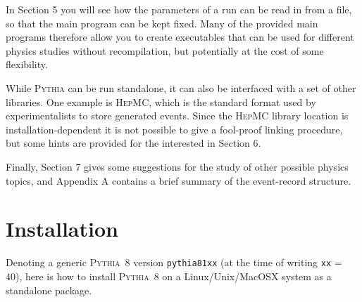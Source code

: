 \documentclass[12pt,a4paper]{article}
\begin{document}
In Section 5 you will see how the parameters of a run can be read in 
from a file, so that the main program can be kept fixed. Many of the 
provided main programs therefore allow you to create executables that 
can be used for different physics studies without recompilation,
but potentially at the cost of some flexibility.    

While \textsc{Pythia} can be run standalone, it can also be interfaced 
with a set of other libraries. One example is \textsc{HepMC}, which 
is the standard format used by experimentalists to store generated 
events. Since the \textsc{HepMC} library location is 
installation-dependent it is not possible to give a fool-proof linking 
procedure, but some hints are provided for the interested in Section 6.

Finally, Section 7 gives some suggestions for the study of other possible 
physics topics, and Appendix A contains a brief summary of the event-record 
structure.

\section{Installation}

Denoting a generic \textsc{Pythia}~8 version \texttt{pythia81xx}
(at the time of writing \texttt{xx} = 40), here is how to install 
\textsc{Pythia}~8 on a Linux/Unix/MacOSX system as a standalone package. 
\end{document}
